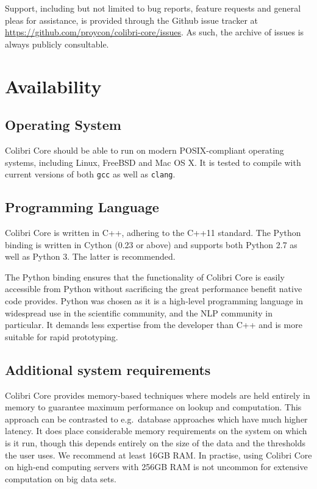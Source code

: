 \documentclass[a4paper,12pt]{article}
\begin{document}
Support, including but not limited to bug reports, feature requests and general
pleas for assistance, is provided through the Github issue tracker at
\url{https://github.com/proycon/colibri-core/issues}. As such, the archive of
issues is always publicly consultable. 

\section{Availability}

\subsection{Operating System}

Colibri Core should be able to run on modern POSIX-compliant operating systems, including
Linux, FreeBSD and Mac OS X. It is tested to compile with current versions of
both \texttt{gcc} as well as \texttt{clang}.

\subsection{Programming Language}

Colibri Core is written in C++, adhering to the C++11 standard. The Python
binding is written in Cython (0.23 or above) and supports both Python 2.7 as
well as Python 3. The latter is recommended.

The Python binding ensures that the functionality of Colibri Core is easily
accessible from Python without sacrificing the great performance benefit native
code provides. Python was chosen as it is a high-level programming language in
widespread use in the scientific community, and the NLP community in
particular. It demands less expertise from the developer than C++ and is more
suitable for rapid prototyping.

\subsection{Additional system requirements}

Colibri Core provides memory-based techniques where models are held entirely in
memory to guarantee maximum performance on lookup and computation.  This
approach can be contrasted to e.g.\ database approaches which have much higher
latency.  It does place considerable memory requirements on the system on which
is it run, though this depends entirely on the size of the data and the
thresholds the user uses. We recommend at least 16GB RAM. In practise, using Colibri
Core on high-end computing servers with 256GB RAM is not uncommon for extensive
computation on big data sets.
\end{document}
